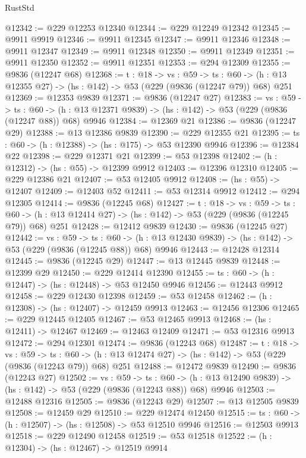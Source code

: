 \begin{lexlean}{RustStd}
\begin{coremodule}
@12342 := @229 @12253 @12340
@12344 := @229 @12249 @12342
@12345 := @9911 @9919
@12346 := @9911 @12345
@12347 := @9911 @12346
@12348 := @9911 @12347
@12349 := @9911 @12348
@12350 := @9911 @12349
@12351 := @9911 @12350
@12352 := @9911 @12351
@12353 := @294 @12309
@12355 := @9836 (@12247 @68)
@12368 := {t : @18} ->
  {vs : @59} ->
  {ts : @60} -> (h : @13 @12355 @27) -> (hs : @142) -> @53 (@229 (@9836 (@12247 @79)) @68) @251
@12369 := @12353 @9839
@12371 := @9836 (@12247 @27)
@12383 := {vs : @59} ->
  {ts : @60} -> (h : @13 @12371 @9839) -> (hs : @142) -> @53 (@229 (@9836 (@12247 @88)) @68) @9946
@12384 := @12369 @21
@12386 := @9836 (@12247 @29)
@12388 := @13 @12386 @9839
@12390 := @229 @12355 @21
@12395 := {ts : @60} -> (h : @12388) -> (hs : @175) -> @53 @12390 @9946
@12396 := @12384 @22
@12398 := @229 @12371 @21
@12399 := @53 @12398
@12402 := (h : @12312) -> (hs : @55) -> @12399 @9912
@12403 := @12396 @12310
@12405 := @229 @12386 @21
@12407 := @53 @12405 @9912
@12408 := (hs : @55) -> @12407
@12409 := @12403 @52
@12411 := @53 @12314 @9912
@12412 := @294 @12305
@12414 := @9836 (@12245 @68)
@12427 := {t : @18} ->
  {vs : @59} ->
  {ts : @60} -> (h : @13 @12414 @27) -> (hs : @142) -> @53 (@229 (@9836 (@12245 @79)) @68) @251
@12428 := @12412 @9839
@12430 := @9836 (@12245 @27)
@12442 := {vs : @59} ->
  {ts : @60} -> (h : @13 @12430 @9839) -> (hs : @142) -> @53 (@229 (@9836 (@12245 @88)) @68) @9946
@12443 := @12428 @12314
@12445 := @9836 (@12245 @29)
@12447 := @13 @12445 @9839
@12448 := @12399 @29
@12450 := @229 @12414 @12390
@12455 := {ts : @60} -> (h : @12447) -> (hs : @12448) -> @53 @12450 @9946
@12456 := @12443 @9912
@12458 := @229 @12430 @12398
@12459 := @53 @12458
@12462 := (h : @12308) -> (hs : @12407) -> @12459 @9913
@12463 := @12456 @12306
@12465 := @229 @12445 @12405
@12467 := @53 @12465 @9913
@12468 := (hs : @12411) -> @12467
@12469 := @12463 @12409
@12471 := @53 @12316 @9913
@12472 := @294 @12301
@12474 := @9836 (@12243 @68)
@12487 := {t : @18} ->
  {vs : @59} ->
  {ts : @60} -> (h : @13 @12474 @27) -> (hs : @142) -> @53 (@229 (@9836 (@12243 @79)) @68) @251
@12488 := @12472 @9839
@12490 := @9836 (@12243 @27)
@12502 := {vs : @59} ->
  {ts : @60} -> (h : @13 @12490 @9839) -> (hs : @142) -> @53 (@229 (@9836 (@12243 @88)) @68) @9946
@12503 := @12488 @12316
@12505 := @9836 (@12243 @29)
@12507 := @13 @12505 @9839
@12508 := @12459 @29
@12510 := @229 @12474 @12450
@12515 := {ts : @60} -> (h : @12507) -> (hs : @12508) -> @53 @12510 @9946
@12516 := @12503 @9913
@12518 := @229 @12490 @12458
@12519 := @53 @12518
@12522 := (h : @12304) -> (hs : @12467) -> @12519 @9914

\end{coremodule}
\end{lexlean}
